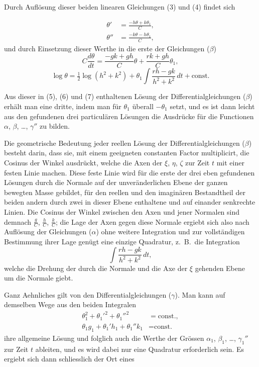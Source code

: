 \documentclass[12pt,a4paper]{book}
\theoremstyle{definition}
\theoremstyle{remark}
\begin{document}
Durch Aufl\"osung dieser beiden linearen Gleichungen (3) und (4) findet sich

\begin{align*}
\theta' &= \frac{-h\theta + k\theta_{1}}{C},\tag{5}\\
\theta'' &= \frac{-k\theta - h\theta_{1}}{C},\tag{6}
\end{align*}
und durch Einsetzung dieser Werthe in die erste der Gleichungen ($\beta$)
\[
C\frac{d\theta}{dt} = \frac{-gk + gh}{C}\theta + \frac{rk + gh}{C}\theta_{1},
\]
\begin{equation*}
\log\theta = \tfrac{1}{2}\log(h^{2} + k^{2}) + \theta_{1}\int\frac{rh - gk}{h^{2} + k^{2}}\,dt + \text{const.}\tag{7}
\end{equation*}

Aus dieser in (5), (6) und (7) enthaltenen L\"osung der Differentialgleichungen ($\beta$) erh\"alt man eine dritte, indem man f\"ur $\theta_{1}$ \"uberall $-\theta_{1}$ setzt, und es ist dann leicht aus den gefundenen drei particul\"aren L\"osungen die Ausdr\"ucke f\"ur die Functionen $\alpha$, $\beta$, \dots, $\gamma''$ zu bilden.

Die geometrische Bedeutung jeder reellen L\"osung der Differentialgleichungen ($\beta$) besteht darin, dass sie, mit einem geeigneten constanten Factor multiplicirt, die Cosinus der Winkel ausdr\"uckt, welche die Axen der $\xi$, $\eta$, $\zeta$ zur Zeit $t$ mit einer festen Linie machen. Diese feste Linie wird f\"ur die erste der drei eben gefundenen L\"osungen durch die Normale auf der unver\"anderlichen Ebene der ganzen bewegten Masse gebildet, f\"ur den reellen und den imagin\"aren Bestandtheil der beiden andern durch zwei in dieser Ebene enthaltene und auf einander senkrechte Linien. Die Cosinus der Winkel zwischen den Axen und jener Normalen sind demnach $\frac{g}{C}$, $\frac{h}{C}$, $\frac{k}{C}$; die Lage der Axen gegen diese Normale ergiebt sich also nach Aufl\"osung der Gleichungen ($\alpha$) ohne weitere Integration und zur vollst\"andigen Bestimmung ihrer Lage gen\"ugt eine einzige Quadratur, z.~B.~die Integration
\begin{equation*}
\int\frac{rh - gk}{h^{2} + k^{2}}\,dt,\tag{$\delta$}
\end{equation*}
welche die Drehung der durch die Normale und die Axe der $\xi$ gehenden Ebene um die Normale giebt.

Ganz Aehnliches gilt von den Differentialgleichungen ($\gamma$). Man kann auf demselben Wege aus den beiden Integralen
\begin{align*}
\theta_{1}^{2} + \theta_{1}'^{2} + \theta_{1}''^{2} &= \text{const.},\tag{VI}\\
\theta_{1}g_{1} + \theta_{1}'h_{1} + \theta_{1}''k_{1} &= \text{const.}\tag{VII}
\end{align*}
ihre allgemeine L\"osung und folglich auch die Werthe der Gr\"ossen $\alpha_{1}$, $\beta_{1}$, \dots, $\gamma_{1}''$ zur Zeit $t$ ableiten, und es wird dabei nur eine Quadratur erforderlich sein. Es ergiebt sich dann schliesslich der Ort eines
\end{document}
